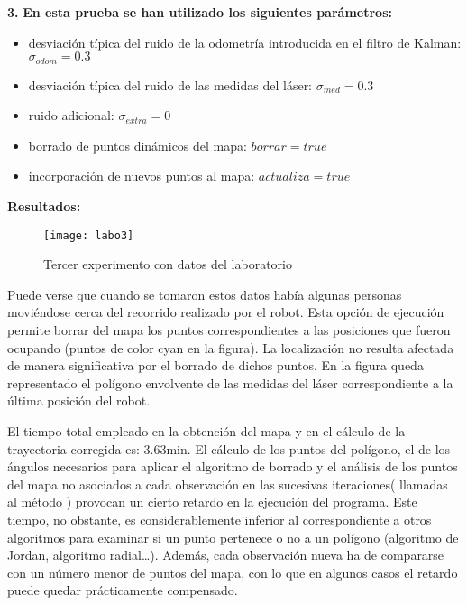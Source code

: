 \vspace{5cm}
\noindent
\textbf{3.} \textbf{En esta prueba se han utilizado los siguientes parámetros:}
\begin{itemize}
  \item desviación típica del ruido de la odometría introducida en el filtro de Kalman: $\sigma_{odom} = 0.3$
  \item desviación típica del ruido de las medidas del láser: $\sigma_{med} = 0.3$
  \item ruido adicional: $\sigma_{extra} = 0$
  \item borrado de puntos dinámicos del mapa: $borrar = true$
  \item incorporación de nuevos puntos al mapa: $actualiza = true$
\end{itemize}


\textbf{Resultados:}

\begin{figure}[h]
  \centering\texttt{[image: labo3]}\\
  \caption{Tercer experimento con datos del laboratorio}\label{fg:labo3}
\end{figure}

Puede verse que cuando se tomaron estos datos había algunas personas moviéndose cerca del recorrido realizado por el robot. Esta opción de ejecución permite borrar del mapa los puntos correspondientes a las posiciones que fueron ocupando (puntos de color cyan en la figura). La localización no resulta afectada de manera significativa por el borrado de dichos puntos. En la figura queda representado el polígono envolvente de las medidas del láser correspondiente a la última posición del robot.

El tiempo total empleado en la obtención del mapa y en el cálculo de la trayectoria corregida es: 3.63min. El cálculo de los puntos del polígono, el de los ángulos necesarios para aplicar el algoritmo de borrado y el análisis de los puntos del mapa no asociados a cada observación en las sucesivas iteraciones( llamadas al método ) provocan un cierto retardo en la ejecución del programa. Este tiempo, no obstante, es considerablemente inferior al correspondiente a otros algoritmos para examinar si un punto pertenece o no a un polígono (algoritmo de Jordan, algoritmo radial\ldots). Además, cada observación nueva ha de compararse con un número menor de puntos del mapa, con lo que en algunos casos el retardo puede quedar prácticamente compensado.

